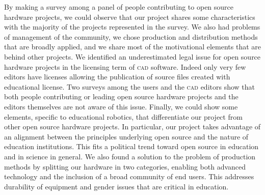 \documentclass[letterpaper, 10 pt, conference]{ieeeconf}  %
\begin{document}
By making a survey among a panel of people contributing to open source hardware projects, we could observe that our project shares some characteristics with the majority of the projects represented in the survey. 
We also had problems of management of the community, we chose production and distribution methods that are broadly applied, and we share most of the motivational elements that are behind other projects.
We identified an underestimated legal issue for open source hardware projects in the licensing term of \textsc{cad} software.
Indeed only very few editors have licenses allowing the publication of source files created with educational license.
Two surveys among the users and the \textsc{cad} editors show that both people contributing or leading open source hardware projects and the editors themselves are not aware of this issue.
Finally, we could show some elements, specific to educational robotics, that differentiate our project from other open source hardware projects.
In particular, our project takes advantage of an alignment between the principles underlying open source and the nature of education institutions. 
This fits a political trend toward open source in education and in science in general.
We also found a solution to the problem of production methods by splitting our hardware in two categories, enabling both advanced technology and the inclusion of a broad community of end users.
This addresses durability of equipment and gender issues that are critical in education.











%
%
%



\end{document}
